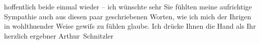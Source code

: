 \begin{ledgroupsized}[t]{13cm}
                    hoffentlich beide einmal wieder – ich wünschte sehr Sie fühlten meine
                    aufrichtige Sympathie auch aus diesen paar geschrie{\pb}benen Worten, wie ich mich der
                    Ihrigen in wohlthuender Weise gewiſs zu fühlen glaube. Ich drücke Ihnen die
                    Hand als Ihr herzlich ergebner\pend
           \pstart \spacefill\mbox{Arthur Schnitzler}\pend{}
         
         \endnumbering{}\end{ledgroupsized}  \newcommand{\dateiname}{L02416}\newcommand{\titel}{Arthur Schnitzler an Felix Braun, 19. 10. 1924}\newcommand{\editorInnen}{Martin Anton Müller und Gerd-Hermann Susen}
      